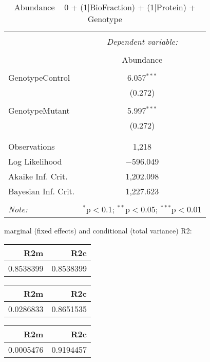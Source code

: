 \documentclass[11pt]{report}
\begin{document}
\begin{table}[!htbp] \centering 
  \caption{Abundance ~ 0 + (1|BioFraction) + (1|Protein) + Genotype} 
  \label{} 
\begin{tabular}{@{\extracolsep{5pt}}lc} 
\\[-1.8ex]\hline 
\hline \\[-1.8ex] 
 & \multicolumn{1}{c}{\textit{Dependent variable:}} \\ 
\cline{2-2} 
\\[-1.8ex] & Abundance \\ 
\hline \\[-1.8ex] 
 GenotypeControl & 6.057$^{***}$ \\ 
  & (0.272) \\ 
  & \\ 
 GenotypeMutant & 5.997$^{***}$ \\ 
  & (0.272) \\ 
  & \\ 
\hline \\[-1.8ex] 
Observations & 1,218 \\ 
Log Likelihood & $-$596.049 \\ 
Akaike Inf. Crit. & 1,202.098 \\ 
Bayesian Inf. Crit. & 1,227.623 \\ 
\hline 
\hline \\[-1.8ex] 
\textit{Note:}  & \multicolumn{1}{r}{$^{*}$p$<$0.1; $^{**}$p$<$0.05; $^{***}$p$<$0.01} \\ 
\end{tabular} 
\end{table} 
marginal (fixed effects) and conditional (total variance) R2:

\begin{tabular}{r|r}
\hline
R2m & R2c\\
\hline
0.8538399 & 0.8538399\\
\hline
\end{tabular}

\begin{tabular}{r|r}
\hline
R2m & R2c\\
\hline
0.0286833 & 0.8651535\\
\hline
\end{tabular}

\begin{tabular}{r|r}
\hline
R2m & R2c\\
\hline
0.0005476 & 0.9194457\\
\hline
\end{tabular}
\end{document}
